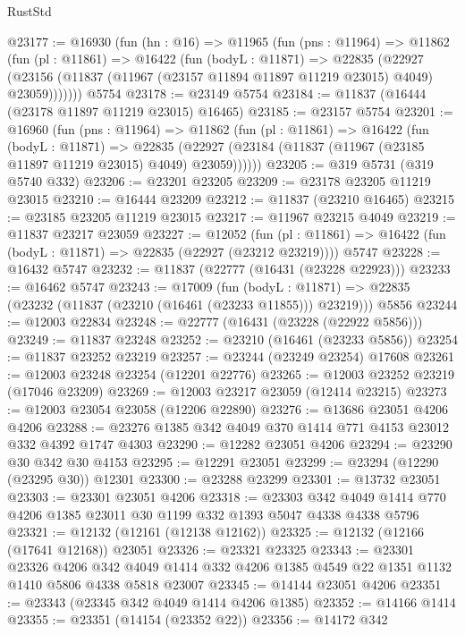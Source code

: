 \begin{lexlean}{RustStd}
\begin{coremodule}
@23177 := @16930
    (fun (hn : @16) =>
    @11965
      (fun (pns : @11964) =>
      @11862
        (fun (pl : @11861) =>
        @16422
          (fun (bodyL : @11871) =>
          @22835
            (@22927
              (@23156 (@11837 (@11967 (@23157 @11894 @11897 @11219 @23015) @4049) @23059)))))))
    @5754
@23178 := @23149 @5754
@23184 := @11837 (@16444 (@23178 @11897 @11219 @23015) @16465)
@23185 := @23157 @5754
@23201 := @16960
    (fun (pns : @11964) =>
    @11862
      (fun (pl : @11861) =>
      @16422
        (fun (bodyL : @11871) =>
        @22835 (@22927 (@23184 (@11837 (@11967 (@23185 @11897 @11219 @23015) @4049) @23059))))))
@23205 := @319 @5731 (@319 @5740 @332)
@23206 := @23201 @23205
@23209 := @23178 @23205 @11219 @23015
@23210 := @16444 @23209
@23212 := @11837 (@23210 @16465)
@23215 := @23185 @23205 @11219 @23015
@23217 := @11967 @23215 @4049
@23219 := @11837 @23217 @23059
@23227 := @12052
    (fun (pl : @11861) => @16422 (fun (bodyL : @11871) => @22835 (@22927 (@23212 @23219))))
    @5747
@23228 := @16432 @5747
@23232 := @11837 (@22777 (@16431 (@23228 @22923)))
@23233 := @16462 @5747
@23243 := @17009
    (fun (bodyL : @11871) => @22835 (@23232 (@11837 (@23210 (@16461 (@23233 @11855))) @23219)))
    @5856
@23244 := @12003 @22834
@23248 := @22777 (@16431 (@23228 (@22922 @5856)))
@23249 := @11837 @23248
@23252 := @23210 (@16461 (@23233 @5856))
@23254 := @11837 @23252 @23219
@23257 := @23244 (@23249 @23254) @17608
@23261 := @12003 @23248 @23254 (@12201 @22776)
@23265 := @12003 @23252 @23219 (@17046 @23209)
@23269 := @12003 @23217 @23059 (@12414 @23215)
@23273 := @12003 @23054 @23058 (@12206 @22890)
@23276 := @13686 @23051 @4206 @4206
@23288 := @23276 @1385 @342 @4049 @370 @1414 @771 @4153 @23012 @332 @4392 @1747 @4303
@23290 := @12282 @23051 @4206
@23294 := @23290 @30 @342 @30 @4153
@23295 := @12291 @23051
@23299 := @23294 (@12290 (@23295 @30)) @12301
@23300 := @23288 @23299
@23301 := @13732 @23051
@23303 := @23301 @23051 @4206
@23318 := @23303
    @342
    @4049
    @1414
    @770
    @4206
    @1385
    @23011
    @30
    @1199
    @332
    @1393
    @5047
    @4338
    @4338
    @5796
@23321 := @12132 (@12161 (@12138 @12162))
@23325 := @12132 (@12166 (@17641 @12168)) @23051
@23326 := @23321 @23325
@23343 := @23301
    @23326
    @4206
    @342
    @4049
    @1414
    @332
    @4206
    @1385
    @4549
    @22
    @1351
    @1132
    @1410
    @5806
    @4338
    @5818
    @23007
@23345 := @14144 @23051 @4206
@23351 := @23343 (@23345 @342 @4049 @1414 @4206 @1385)
@23352 := @14166 @1414
@23355 := @23351 (@14154 (@23352 @22))
@23356 := @14172 @342

\end{coremodule}
\end{lexlean}
